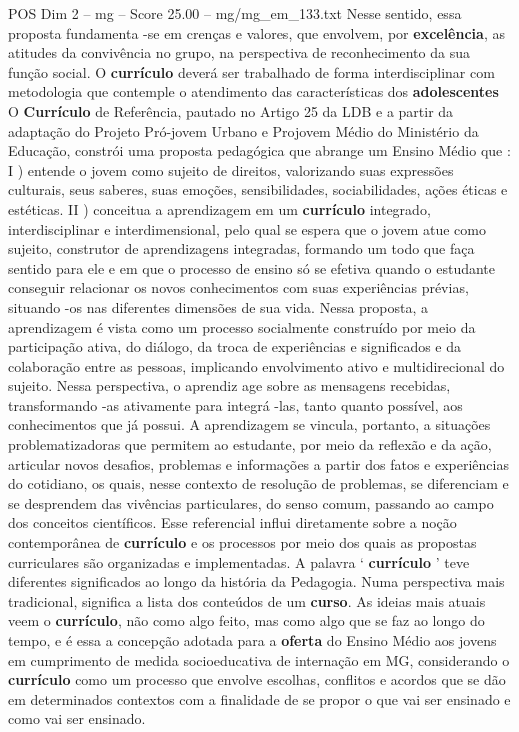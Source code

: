 \begin{textsample}{POS Dim 2 – mg – Score 25.00 – mg/mg\_em\_133.txt}
Nesse sentido, essa proposta fundamenta -se em crenças e valores, que envolvem, por \textbf{excelência}, as atitudes da convivência no grupo, na perspectiva de reconhecimento da sua função social.
O \textbf{currículo} deverá ser trabalhado de forma interdisciplinar com metodologia que contemple o atendimento das características dos \textbf{adolescentes} O \textbf{Currículo} de Referência, pautado no Artigo 25 da LDB e a partir da adaptação do Projeto Pró-jovem Urbano e Projovem Médio do Ministério da Educação, constrói uma proposta pedagógica que abrange um Ensino Médio que : I ) entende o jovem como sujeito de direitos, valorizando suas expressões culturais, seus saberes, suas emoções, sensibilidades, sociabilidades, ações éticas e estéticas.
II ) conceitua a aprendizagem em um \textbf{currículo} integrado, interdisciplinar e interdimensional, pelo qual se espera que o jovem atue como sujeito, construtor de aprendizagens integradas, formando um todo que faça sentido para ele e em que o processo de ensino só se efetiva quando o estudante conseguir relacionar os novos conhecimentos com suas experiências prévias, situando -os nas diferentes dimensões de sua vida.
Nessa proposta, a aprendizagem é vista como um processo socialmente construído por meio da participação ativa, do diálogo, da troca de experiências e significados e da colaboração entre as pessoas, implicando envolvimento ativo e multidirecional do sujeito.
Nessa perspectiva, o aprendiz age sobre as mensagens recebidas, transformando -as ativamente para integrá -las, tanto quanto possível, aos conhecimentos que já possui.
A aprendizagem se vincula, portanto, a situações problematizadoras que permitem ao estudante, por meio da reflexão e da ação, articular novos desafios, problemas e informações a partir dos fatos e experiências do cotidiano, os quais, nesse contexto de resolução de problemas, se diferenciam e se desprendem das vivências particulares, do senso comum, passando ao campo dos conceitos científicos.
Esse referencial influi diretamente sobre a noção contemporânea de \textbf{currículo} e os processos por meio dos quais as propostas curriculares são organizadas e implementadas.
A palavra ‘ \textbf{currículo} ’ teve diferentes significados ao longo da história da Pedagogia.
Numa perspectiva mais tradicional, significa a lista dos conteúdos de um \textbf{curso}.
As ideias mais atuais veem o \textbf{currículo}, não como algo feito, mas como algo que se faz ao longo do tempo, e é essa a concepção adotada para a \textbf{oferta} do Ensino Médio aos jovens em cumprimento de medida socioeducativa de internação em MG, considerando o \textbf{currículo} como um processo que envolve escolhas, conflitos e acordos que se dão em determinados contextos com a finalidade de se propor o que vai ser ensinado e como vai ser ensinado.

\end{textsample}
